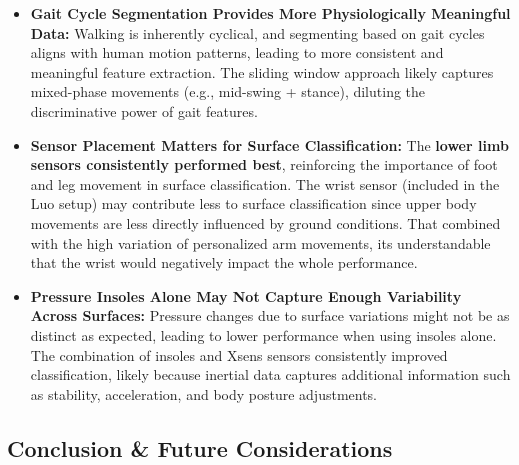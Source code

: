 \begin{itemize}
    \item \textbf{Gait Cycle Segmentation Provides More Physiologically Meaningful Data:} Walking is inherently cyclical, and segmenting based on gait cycles aligns with human motion patterns, leading to more consistent and meaningful feature extraction. The sliding window approach likely captures mixed-phase movements (e.g., mid-swing + stance), diluting the discriminative power of gait features.
    \item \textbf{Sensor Placement Matters for Surface Classification:} The \textbf{lower limb sensors consistently performed best}, reinforcing the importance of foot and leg movement in surface classification. The wrist sensor (included in the Luo setup) may contribute less to surface classification since upper body movements are less directly influenced by ground conditions. That combined with the high variation of personalized arm movements, its understandable that the wrist would negatively impact the whole performance.
    \item \textbf{Pressure Insoles Alone May Not Capture Enough Variability Across Surfaces:} Pressure changes due to surface variations might not be as distinct as expected, leading to lower performance when using insoles alone. The combination of insoles and Xsens sensors consistently improved classification, likely because inertial data captures additional information such as stability, acceleration, and body posture adjustments. 
\end{itemize}

\subsection{Conclusion \& Future Considerations}

